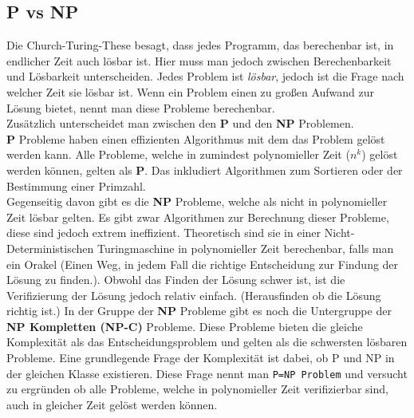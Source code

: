 \documentclass{article}
\begin{document}
	 \subsection{P vs NP}
	 Die Church-Turing-These besagt, dass jedes Programm, das berechenbar ist, in endlicher Zeit auch lösbar ist. Hier muss man jedoch zwischen Berechenbarkeit und Lösbarkeit unterscheiden. Jedes Problem ist \textit{lösbar}, jedoch ist die Frage nach welcher Zeit sie lösbar ist. Wenn ein Problem einen zu großen Aufwand zur Lösung bietet, nennt man diese Probleme berechenbar. \\
	 Zusätzlich unterscheidet man zwischen den \textbf{P} und den \textbf{NP} Problemen. \\
	 \textbf{P} Probleme haben einen effizienten Algorithmus mit dem das Problem gelöst werden kann. Alle Probleme, welche in zumindest polynomieller Zeit ($n^k$) gelöst werden können, gelten als \textbf{P}. Das inkludiert Algorithmen zum Sortieren oder der Bestimmung einer Primzahl. \\
	 Gegenseitig davon gibt es die \textbf{NP} Probleme, welche als nicht in polynomieller Zeit lösbar gelten. Es gibt zwar Algorithmen zur Berechnung dieser Probleme, diese sind jedoch extrem ineffizient. Theoretisch sind sie in einer Nicht-Deterministischen Turingmaschine in polynomieller Zeit berechenbar, falls man ein Orakel (Einen Weg, in jedem Fall die richtige Entscheidung zur Findung der Lösung zu finden.). Obwohl das Finden der Lösung schwer ist, ist die Verifizierung der Lösung jedoch relativ einfach. (Herausfinden ob die Lösung richtig ist.) In der Gruppe der \textbf{NP} Probleme gibt es noch die Untergruppe der \textbf{NP Kompletten (NP-C)} Probleme. Diese Probleme bieten die gleiche Komplexität als das Entscheidungsproblem und gelten als die schwersten lösbaren Probleme. Eine grundlegende Frage der Komplexität ist dabei, ob P und NP in der gleichen Klasse existieren. Diese Frage nennt man \verb|P=NP Problem| und versucht zu ergründen ob alle Probleme, welche in polynomieller Zeit verifizierbar sind, auch in gleicher Zeit gelöst werden können.
\end{document}
